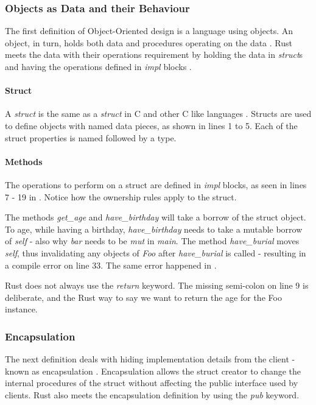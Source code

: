 \subsubsection{Objects as Data and their Behaviour}
The first definition of Object-Oriented design is a language using objects.
An object, in turn, holds both data and procedures operating on the data \cite{meyer_97_01,stefik_85_01,gamma_94_01}.
Rust meets the data with their operations requirement by holding the data in \textit{struct}s and having the operations defined in \textit{impl} blocks \cite{klabnik_2019_01}.

\paragraph{Struct}
A \textit{struct} is the same as a \textit{struct} in C \cite{stroustrup_13_01} and other C like languages \cite{robinson_04_01, savitch_15_01, malik_09_01}.
Structs are used to define objects with named data pieces, as shown in  lines 1 to 5.
Each of the struct properties is named followed by a type.


\paragraph{Methods}
The operations to perform on a struct are defined in \textit{impl} blocks, as seen in lines 7 - 19 in .
Notice how the ownership rules apply to the struct.

The methods \textit{get\_age} and \textit{have\_birthday} will take a borrow of the struct object.
To age, while having a birthday, \textit{have\_birthday} needs to take a mutable borrow of \textit{self} - also why \textit{bar} needs to be \textit{mut} in \textit{main}.
The method \textit{have\_burial} moves \textit{self}, thus invalidating any objects of \textit{Foo} after \textit{have\_burial} is called - resulting in a compile error on line 33.
The same error happened in .

\begin{notebox}
	Rust does not always use the \textit{return} keyword.
	The missing semi-colon on line 9 is deliberate, and the Rust way to say we want to return the age for the Foo instance.
\end{notebox}

\subsubsection{Encapsulation}
The next definition deals with hiding implementation details from the client - known as encapsulation \cite{klabnik_2019_01, meyer_97_01}.
Encapsulation allows the struct creator to change the internal procedures of the struct without affecting the public interface used by clients.
Rust also meets the encapsulation definition by using the \textit{pub} keyword.

